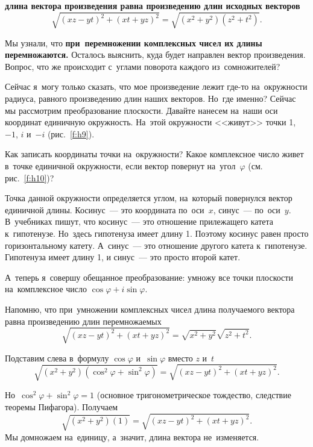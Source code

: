 \textbf{длина вектора произведения равна произведению длин исходных векторов}
$$
\sqrt{(xz-yt)^{2}+(xt+yz)^{2}} =
\sqrt{(x^{2}+y^{2})(z^{2}+t^{2})}.
$$


Мы узнали, что \textbf{при~перемножении комплексных чисел их длины перемножаются.} Осталось выяснить, куда
будет направлен вектор произведения. Вопрос, что же происходит с~углами поворота каждого
из~сомножителей?

Сейчас я~могу только сказать, что мое произведение лежит где-то на~окружности радиуса, равного
произведению длин наших векторов. Но~где именно? Сейчас мы рассмотрим преобразование плоскости.
Давайте нанесем на~наши оси координат единичную окружность. На~этой окружности <<живут>> точки 1,
$-1$, $i$ и~$-i$ (рис.~\ref{f:h9}).

%
%
%


Как записать координаты точки на~окружности? Какое комплексное число живет в~точке единичной
окружности, если вектор повернут на~угол~$\varphi$ (см. рис.~\ref{f:h10})?

%
%



Точка данной окружности определяется углом, на~который повернулся вектор единичной длины.
Косинус~--- это координата по~оси~$x$, синус~--- по~оси~$y$. В~учебниках пишут, что косинус~--- это
отношение прилежащего катета к~гипотенузе. Но~здесь гипотенуза имеет длину 1. Поэтому косинус равен
просто горизонтальному катету. А~синус~--- это отношение другого катета к~гипотенузе. Гипотенуза
имеет длину 1, и синус~--- это просто
второй катет.

А~теперь я~совершу обещанное преобразование: умножу все точки плоскости на~комплексное число
$\cos\varphi+i\sin\varphi$.

Напомню, что при~умножении комплексных чисел длина получаемого вектора равна произведению длин перемножаемых
$$
\sqrt{(xz-yt)^{2}+(xt+yz)^{2}}=
\sqrt{x^{2}+y^{2}}\sqrt {z^{2}+t^{2}}.
$$


Подставим слева в~формулу $\cos\varphi$ и~$\sin\varphi$ вместо $z$ и~$t$
$$
\sqrt{(x^{2}+y^{2})(\cos^{2}\varphi+\sin^{2}\varphi)}=
\sqrt{(xz-yt)^{2}+(xt+yz)^{2}}.
$$

Но~$\cos^{2}\varphi+\sin^{2}\varphi=1$ (основное тригонометрическое тождество, следствие теоремы Пифагора). Получаем
$$
\sqrt{(x^{2}+y^{2})(1)}=
\sqrt{(xz-yt)^{2}+(xt+yz)^{2}}.
$$
Мы домножаем на~единицу, а~значит, длина вектора не~изменяется.

